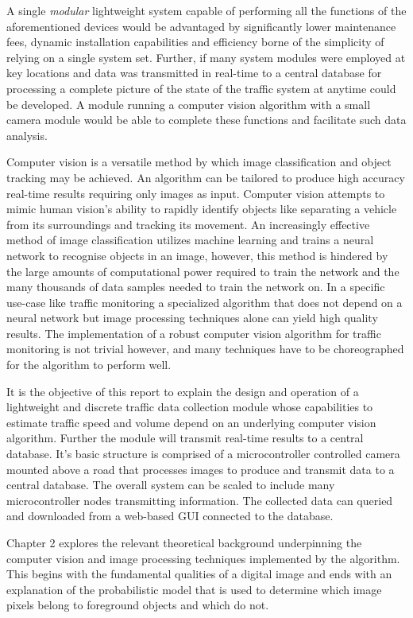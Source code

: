 A single \emph{modular} lightweight system capable of performing all the functions of the aforementioned devices would be advantaged by significantly lower maintenance fees, dynamic installation capabilities and efficiency borne of the simplicity of relying on a single system set. Further, if many system modules were employed at key locations and data was transmitted in real-time to a central database for processing a complete picture of the state of the traffic system at anytime could be developed. A module running a computer vision algorithm with a small camera module would be able to complete these functions and facilitate such data analysis.

Computer vision is a versatile method by which image classification and object tracking may be achieved. An algorithm can be tailored to produce high accuracy real-time results requiring only images as input. Computer vision attempts to mimic human vision's ability to rapidly identify objects like separating a vehicle from its surroundings and tracking its movement. An increasingly effective method of image classification utilizes machine learning and trains a neural network to recognise objects in an image, however, this method is hindered by the large amounts of computational power required to train the network and the many thousands of data samples needed to train the network on. In a specific use-case like traffic monitoring a specialized algorithm that does not depend on a neural network but image processing techniques alone can yield high quality results. The implementation of a robust computer vision algorithm for traffic monitoring is not trivial however, and many techniques have to be choreographed for the algorithm to perform well.

It is the objective of this report to explain the design and operation of a lightweight and discrete traffic data collection module whose capabilities to estimate traffic speed and volume depend on an underlying computer vision algorithm. Further the module will transmit real-time results to a central database. It's basic structure is comprised of a microcontroller controlled camera mounted above a road that processes images to produce and transmit data to a central database. The overall system can be scaled to include many microcontroller nodes transmitting information. The collected data can queried and downloaded from a web-based GUI connected to the database.

Chapter 2 explores the relevant theoretical background underpinning the computer vision and image processing techniques implemented by the algorithm. This begins with the fundamental qualities of a digital image and ends with an explanation of the probabilistic model that is used to determine which image pixels belong to foreground objects and which do not. 

